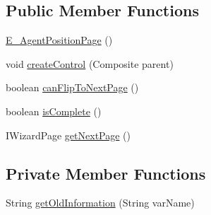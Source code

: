 \subsection*{Public Member Functions}
\begin{DoxyCompactItemize}
\item 
\hyperlink{classit_1_1isislab_1_1masonhelperdocumentation_1_1mason_1_1wizards_1_1_e___agent_position_page_a4843ffdf6b49c44c8a1377c43633e54e}{E\-\_\-\-Agent\-Position\-Page} ()
\item 
void \hyperlink{classit_1_1isislab_1_1masonhelperdocumentation_1_1mason_1_1wizards_1_1_e___agent_position_page_ad87852b68ae457daf1f8b8f33f5de347}{create\-Control} (Composite parent)
\item 
boolean \hyperlink{classit_1_1isislab_1_1masonhelperdocumentation_1_1mason_1_1wizards_1_1_e___agent_position_page_a1408a68c86bfc825d4f7967661348ece}{can\-Flip\-To\-Next\-Page} ()
\item 
boolean \hyperlink{classit_1_1isislab_1_1masonhelperdocumentation_1_1mason_1_1wizards_1_1_e___agent_position_page_a9b197d26e57a1852efd161c80bfed8b3}{is\-Complete} ()
\item 
I\-Wizard\-Page \hyperlink{classit_1_1isislab_1_1masonhelperdocumentation_1_1mason_1_1wizards_1_1_e___agent_position_page_a6a67b4deaedf9bb4c355ace4f82fb217}{get\-Next\-Page} ()
\end{DoxyCompactItemize}
\subsection*{Private Member Functions}
\begin{DoxyCompactItemize}
\item 
String \hyperlink{classit_1_1isislab_1_1masonhelperdocumentation_1_1mason_1_1wizards_1_1_e___agent_position_page_abbfcd1c82111d39f7e55ef3676f1437f}{get\-Old\-Information} (String var\-Name)
\end{DoxyCompactItemize}
